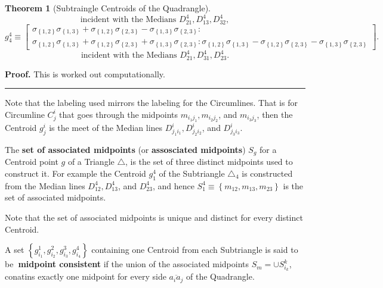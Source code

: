 \documentclass{unswthesis}
\newtheorem{theorem}{Theorem}
\newenvironment{proof}[1][Proof]{\noindent\textbf{#1.} }{\ \rule{0.5em}{0.5em}}
\begin{document}
\begin{theorem}[Subtraingle Centroids of the Quadrangle]
\begin{equation*}
\text{incident with the Medians }D_{21}^{4},D_{13}^{4},D_{32}^{4},
\end{equation*}%
\begin{equation*}
g_{4}^{4}\equiv \left[ 
\begin{array}{c}
\sigma _{\left\{ 1,2\right\} }\sigma _{\left\{ 1,3\right\} }+\sigma
_{\left\{ 1,2\right\} }\sigma _{\left\{ 2,3\right\} }-\sigma _{\left\{
1,3\right\} }\sigma _{\left\{ 2,3\right\} }: \\ 
\sigma _{\left\{ 1,2\right\} }\sigma _{\left\{ 1,3\right\} }+\sigma
_{\left\{ 1,2\right\} }\sigma _{\left\{ 2,3\right\} }+\sigma _{\left\{
1,3\right\} }\sigma _{\left\{ 2,3\right\} }:\sigma _{\left\{ 1,2\right\}
}\sigma _{\left\{ 1,3\right\} }-\sigma _{\left\{ 1,2\right\} }\sigma
_{\left\{ 2,3\right\} }-\sigma _{\left\{ 1,3\right\} }\sigma _{\left\{
2,3\right\} }%
\end{array}%
\right] .
\end{equation*}%
\begin{equation*}
\text{incident with the Medians }D_{21}^{4},D_{31}^{4},D_{23}^{4}.
\end{equation*}
\end{theorem}

\begin{proof}
This is worked out computationally.
\end{proof}

\bigskip 

Note that the labeling used mirrors the labeling for the Circumlines. That
is for Circumline $C_{j}^{i}$ that goes through the midpoints $%
m_{i_{1}j_{1}},m_{i_{2}j_{2}}$, and $m_{i_{3}j_{3}}$, then the Centroid $%
g_{j}^{i}$ is the meet of the Median lines $%
D_{j_{1}i_{1}}^{i},D_{j_{2}i_{2}}^{i}$, and $D_{j_{3}i_{3}}^{i}.$

\bigskip 

The \textbf{set of associated midpoints} (or \textbf{assosciated midpoints}) 
$S_{g}$ for a Centroid point $g$ of a Triangle $\triangle $, is the set of
three distinct midpoints used to construct it. For example the Centroid $%
g_{1}^{4}$ of the Subtriangle $\triangle _{4}$ is constructed from the
Median lines $D_{12}^{4},D_{13}^{4}$, and $D_{23}^{4}$, and hence $%
S_{1}^{4}\equiv \left\{ m_{12},m_{13},m_{23}\right\} $ is the set of
associated midpoints.

Note that the set of associated midpoints is unique and distinct for every
distinct Centroid.

A set $\left\{
g_{i_{1}}^{1},g_{i_{2}}^{2},g_{i_{3}}^{3},g_{i_{4}}^{4}\right\} $ containing
one Centroid from each Subtriangle is said to be\textbf{\ midpoint consistent%
} if the union of the associated midpoints $S_{m}=\cup S_{i_{k}}^{k}$,
conatins exactly one midpoint for every side $\overline{a_{i}a_{j}}$ of the
Quadrangle.
\end{document}
